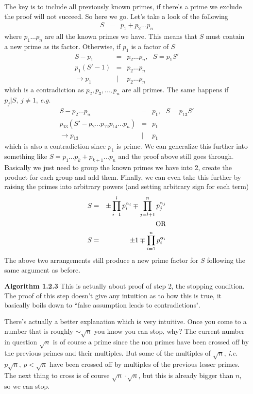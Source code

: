 \documentclass[aps,preprint,preprintnumbers,nofootinbib,showpacs,prd]{revtex4-1}
\newcommand{\ie}{{\it i.e.} }
\newcommand{\eg}{{\it e.g.} }
\newcommand{\nbea}{\begin{eqnarray*}}
\newcommand{\neea}{\end{eqnarray*}}
\begin{document}
The key is to include all previously known primes, if there's a prime we exclude the proof will not succeed. So here we go. Let's take a look of the following
%
\nbea
S & = & p_1 + p_2 \dots p_n
\neea
%
where $p_1 \dots p_n$ are all the known primes we have. This means that $S$ must contain a new prime as its factor. Otherwise, if $p_1$ is a factor of $S$
%
\nbea
S - p_1 & = & p_2 \dots p_n, ~~~ S = p_1 S' \\
p_1(S' - 1) & = & p_2 \dots p_n \\
\to p_1 &|& p_2 \dots p_n
\neea
which is a contradiction as $p_2, p_3, \dots, p_n$ are all primes. The same happens if $p_j | S,~j \neq 1$, \eg
%
\nbea
S - p_2 \dots p_n & = & p_1, ~~~ S = p_{13} S' \\
p_{13}(S' - p_2 \dots p_{12}p_{14} \dots p_n) & = & p_1 \\
\to p_{13} &|& p_1
\neea
%
which is also a contradiction since $p_1$ is prime. We can generalize this further into something like $S = p_1 \dots p_k + p_{k+1} \dots p_n$ and the proof above still goes through. Basically we just need to group the known primes we have into 2, create the product for each group and add them. Finally, we can even take this further by raising the primes into arbitrary powers (and setting arbitrary sign for each term)
%
\nbea
S & = & \pm \prod_{i=1}^{l}p_{i}^{\alpha_i} \mp \prod_{j=l+1}^{n}p_{j}^{\alpha_j} \\
& &  ~~~~~{\rm OR}\\
S & = & \pm 1 \mp \prod_{i=1}^{n}p_{i}^{\alpha_i}
\neea
%
The above two arrangements still produce a new prime factor for $S$ following the same argument as before. 


{\bf Algorithm 1.2.3} This is actually about proof of step 2, the stopping condition. The proof of this step doesn't give any intuition as to how this is true, it basically boils down to ``false assumption leads to contradictions".

There's actually a better explanation which is very intuitive. Once you come to a number that is roughly $\sim \sqrt{n}$ you know you can stop, why? The current number in question $\sqrt{n}$ is of course a prime since the non primes have been crossed off by the previous primes and their multiples. But some of the multiples of $\sqrt{n}$, \ie $p \sqrt{n}, ~ p < \sqrt{n}$ have been crossed off by multiples of the previous lesser primes. The next thing to cross is of course $\sqrt{n} \cdot \sqrt{n}$, but this is already bigger than $n$, so we can stop.
\end{document}
